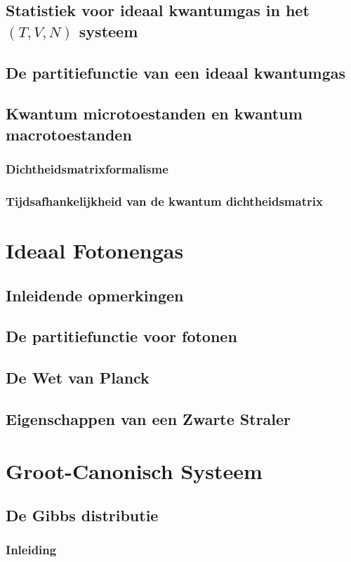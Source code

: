 \documentclass[a4paper,twoside]{article}
\theoremstyle{definition}
\theoremstyle{plain}
\begin{document}
\subsection{Statistiek voor ideaal kwantumgas in het $(T,V,N)$ systeem}
\subsection{De partitiefunctie van een ideaal kwantumgas}
\subsection{Kwantum microtoestanden en kwantum macrotoestanden}
\subsubsection{Dichtheidsmatrixformalisme}
\subsubsection{Tijdsafhankelijkheid van de kwantum dichtheidsmatrix}

\section{Ideaal Fotonengas}
\subsection{Inleidende opmerkingen}
\subsection{De partitiefunctie voor fotonen}
\subsection{De Wet van Planck}
\subsection{Eigenschappen van een Zwarte Straler}

\section{Groot-Canonisch Systeem}
\subsection{De Gibbs distributie}
\subsubsection{Inleiding}
\end{document}
